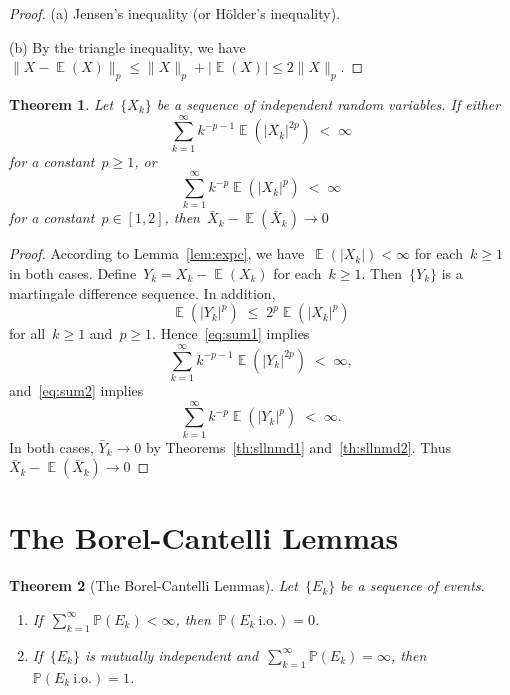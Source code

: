 \documentclass[12pt,a4paper]{article}  %
\newtheorem{theorem}{Theorem}[section]
\theoremstyle{definition}
\numberwithin{equation}{section}
\newcommand{\io}{{\text{i.o.}}\xspace}
\newcommand{\as}{{\text{a.s.}}\xspace}
\DeclareMathOperator{\expc}{\mathbb{E}}
\renewcommand{\Pr}{\mathbb{P}}
\begin{document}
\begin{proof}
    (a) Jensen's inequality (or H\"older's inequality).

    (b) By the triangle inequality, we have~$\|X - \expc(X)\|_p \le \|X\|_p + |\expc(X)| \le 2\|X\|_p$.
\end{proof}

\begin{theorem}
    \label{th:sllnindep}
    Let~$\{X_k\}$ be a sequence of independent random variables. If
    either
   \begin{equation}
    \label{eq:sum1}
    \sum_{k=1}^\infty k^{-p-1}\expc(|X_k|^{2p}) \;<\; \infty
   \end{equation}
   for a constant~$p\ge 1$, or
   \begin{equation}
    \label{eq:sum2}
    \sum_{k=1}^\infty k^{-p}\expc(|X_k|^{p}) \;<\; \infty
   \end{equation}
   for a constant~$p\in[1, 2]$, then~$\bar{X}_k - \expc(\bar{X}_k)\to 0$ \as
\end{theorem}

\begin{proof}
    According to Lemma~\ref{lem:expc}, we have~$\expc(|X_k|) < \infty$ for each~$k\ge 1$ in both cases.
    Define~$Y_k = X_k - \expc(X_k)$ for each~$k\ge 1$. Then~$\{Y_k\}$ is a martingale difference
    sequence. In addition,
    \[
        \expc(|Y_k|^{p}) \;\le\; 2^{p} \expc(|X_k|^p)
    \]
    for all~$k\ge 1$ and~$p\ge 1$. Hence~\eqref{eq:sum1} implies
   \begin{equation}
    \label{eq:sum1}
    \sum_{k=1}^\infty k^{-p-1}\expc(|Y_k|^{2p}) \;<\; \infty,
   \end{equation}
    and~\eqref{eq:sum2} implies
   \begin{equation}
    \label{eq:sum2}
    \sum_{k=1}^\infty k^{-p}\expc(|Y_k|^{p}) \;<\; \infty.
   \end{equation}
   In both cases, $\bar{Y}_k \to 0$ \as by Theorems~\ref{th:sllnmd1} and~\ref{th:sllnmd2}.
   Thus~$\bar{X}_k - \expc(\bar{X}_k) \to 0$ \as
\end{proof}


\section{The Borel-Cantelli Lemmas}
\label{sec:bc}

\begin{theorem}[The Borel-Cantelli Lemmas]
    \label{th:bc}
    Let~$\{E_k\}$ be a sequence of events.
    \begin{enumerate}
        \item If~$\sum_{k=1}^\infty \Pr(E_k) < \infty$, then~$\Pr(E_k~\io) = 0$.
        \item If~$\{E_k\}$ is mutually independent and~$\sum_{k=1}^\infty \Pr(E_k)
            = \infty$, then~$\Pr(E_k~\io) = 1$.
    \end{enumerate}
\end{theorem}
\end{document}
